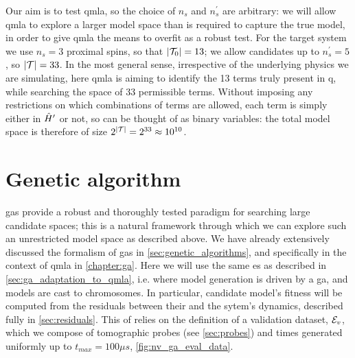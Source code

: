 \par 

Our aim is to test \gls{qmla}, so the choice of $n_s$ and $n_s^{\prime}$ are arbitrary:
    we will allow \gls{qmla} to explore a larger \gls{model space} than is required to 
    capture the \gls{true model}, in order to give \gls{qmla} the means to overfit as a robust test. 
For the target system we use $n_s=3$ proximal spins, 
    so that  $\left\lvert \mathcal{T}_0 \right\rvert = 13$;
    we allow candidates up to $n_s^{\prime}=5$, 
    so $\left\lvert \mathcal{T} \right\rvert = 33$. 
In the most general sense, irrespective of the underlying physics we are simulating, 
    here \gls{qmla} is aiming to identify the 13 terms truly present in \gls{q}, 
    while searching the space of 33 permissible terms. 
Without imposing any restrictions on which combinations of terms are allowed, 
    each term is simply either in $\hat{H}^{\prime}$ or not, so can be thought of as binary variables:
    the total \gls{model space} is therefore of size $2^{\left\lvert \mathcal{T} \right\rvert}=2^{33} \approx 10^{10}$. 

\section{Genetic algorithm}
\Glspl{ga} provide a robust and thoroughly tested paradigm for searching large candidate spaces; 
    this is a natural framework through which we can explore such an unrestricted model space 
    as described above. 
We have already extensively discussed the formalism of \glspl{ga} in \cref{sec:genetic_algorithms}, 
    and specifically in the context of \gls{qmla} in \cref{chapter:ga}.
Here we will use the same \gls{es} as described in \cref{sec:ga_adaptation_to_qmla}, 
    i.e. where model generation is driven by a \gls{ga}, 
    and models are cast to \glspl{chromosome}. 
In particular, candidate model's fitness will be computed from the residuals
    between their and the sytem's dynamics, described fully in \cref{sec:residuals}. 
This \acrfull{of} relies on the definition of a validation dataset, ${ \mathcal{E} }_v$,
    which we compose of tomographic \glspl{probe} (see \cref{sec:probes}) 
    and times generated uniformly up to 
    $t_{max} = 100 \mu s$, \cref{fig:nv_ga_eval_data}. 

